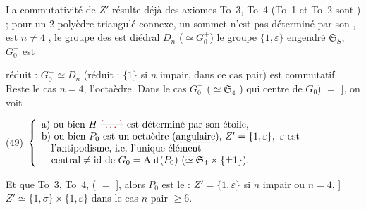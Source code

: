 \documentclass[11pt,a4paper]{article}
\begin{document}
La commutativité de $Z'$  résulte déjà des axiomes To~3, To~4
(To~1 et To~2 sont \ill{}) ; pour un 2-polyèdre triangulé connexe,  un
sommet n'est pas déterminé par son  
\add{\ill{}},  est  \ill{} $n\neq 4$ \ill{}
 \ill{}, le groupe des  est
\ill{} diédral $D_n$ ($\simeq G_0^{+}$) \ill{} le groupe $\{1,\varepsilon\}$ engendré
\ill{} $\mathfrak{S}_S$, $G_0^{+}$ est  \ill{}

réduit : $G_0^{+}\simeq D_n$ (réduit : $\{1\}$ si $n$ impair, \ill{} dans ce cas
pair) \ill{} est commutatif. Reste le cas \ill{} $n=4$, \ill{} \ill{} \ill{} l'octaèdre.
Dans le cas $G_0^{+}$ ($\simeq\mathfrak{S}_4$  \ill{}) qui \ill{}
\ill{} \ill{} centre de $G_0$) \struck{\ill{}}  \ill{}
$=$ ], on voit

(49) $\left\{\begin{array}{l}
\text{a) ou bien } H \text{ \struck{\ill{}} est déterminé par son étoile,}\\
\text{b) ou bien } P_0 \text{ est un octaèdre (\uncertain{angulaire}), } Z'=\{1,\varepsilon\},
\ \varepsilon \text{ est}\\
\quad\text{l'antipodisme, i.e.\ l'unique élément}\\
\quad\text{central} \neq \mathrm{id} \text{ de } G_0=\mathrm{Aut}(P_0)\ 
(\simeq \mathfrak{S}_4\times\{\pm 1\}).
\end{array}\right.$

Et  \ill{} \ill{} que To~3, To~4, (
\ill{} \ill{} $=$ \uncertain{ordre}], alors $P_0$ est le \ill{} :
$Z'=\{1,\varepsilon\}$ si $n$ impair ou $n=4$, ]
$Z'\simeq\{1,\sigma\}\times\{1,\varepsilon\}$ dans le cas $n$ pair $\geqslant 6$.
\end{document}

